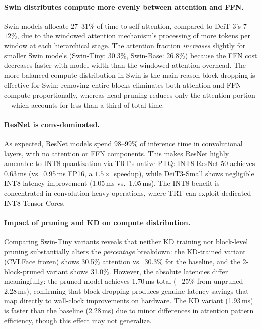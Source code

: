 \documentclass[runningheads,a4paper]{llncs}
\begin{document}
\paragraph{Swin distributes compute more evenly between attention and FFN.}
Swin models allocate $27$--$31\%$ of time to self-attention, compared to DeiT-3's $7$--$12\%$, due to the windowed attention mechanism's processing of more tokens per window at each hierarchical stage. The attention fraction \emph{increases} slightly for smaller Swin models (Swin-Tiny: 30.3\%, Swin-Base: 26.8\%) because the FFN cost decreases faster with model width than the windowed attention overhead. The more balanced compute distribution in Swin is the main reason block dropping is effective for Swin: removing entire blocks eliminates both attention and FFN compute proportionally, whereas head pruning reduces only the attention portion---which accounts for less than a third of total time.

\paragraph{ResNet is conv-dominated.}
As expected, ResNet models spend $98$--$99\%$ of inference time in convolutional layers, with no attention or FFN components. This makes ResNet highly amenable to INT8 quantization via TRT's native PTQ: INT8 ResNet-50 achieves 0.63\,ms (vs.\ 0.95\,ms FP16, a $1.5\times$ speedup), while DeiT3-Small shows negligible INT8 latency improvement (1.05\,ms vs.\ 1.05\,ms). The INT8 benefit is concentrated in convolution-heavy operations, where TRT can exploit dedicated INT8 Tensor Cores.

\paragraph{Impact of pruning and KD on compute distribution.}
Comparing Swin-Tiny variants reveals that neither KD training nor block-level pruning substantially alters the \emph{percentage} breakdown: the KD-trained variant (CVLFace frozen) shows 30.5\% attention vs.\ 30.3\% for the baseline, and the 2-block-pruned variant shows 31.0\%. However, the absolute latencies differ meaningfully: the pruned model achieves 1.70\,ms total ($-25\%$ from unpruned 2.28\,ms), confirming that block dropping produces genuine latency savings that map directly to wall-clock improvements on hardware. The KD variant (1.93\,ms) is faster than the baseline (2.28\,ms) due to minor differences in attention pattern efficiency, though this effect may not generalize.
\end{document}
